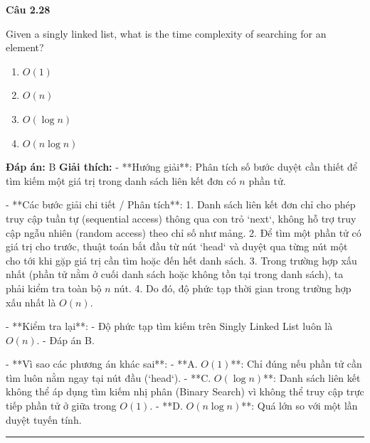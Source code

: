 \documentclass[11pt,a4paper]{article}
\newenvironment{question}[1]{%
  \par\vspace{1em}\noindent\textbf{\large Câu #1}\par\vspace{0.4em}
}{%
  \par\vspace{1em}\hrule\vspace{0.6em}
}
\newenvironment{choices}{%
  \begin{enumerate}[label=\textbf{\Alph*.},leftmargin=2.2em,itemsep=2pt,topsep=3pt]
}{%
  \end{enumerate}
}
\newcommand{\choice}{\item}
\begin{document}
\begin{question}{2.28}
Given a singly linked list, what is the time complexity of searching for an element?
\begin{choices}
\choice \(O(1)\)
\choice \(O(n)\)
\choice \(O(\log n)\)
\choice \(O(n \log n)\)
\end{choices}
\textbf{Đáp án:} B
\textbf{Giải thích:} - **Hướng giải**:
  Phân tích số bước duyệt cần thiết để tìm kiếm một giá trị trong danh sách liên kết đơn có \(n\) phần tử.

- **Các bước giải chi tiết / Phân tích**:
  1. Danh sách liên kết đơn chỉ cho phép truy cập tuần tự (sequential access) thông qua con trỏ `next`, không hỗ trợ truy cập ngẫu nhiên (random access) theo chỉ số như mảng.
  2. Để tìm một phần tử có giá trị cho trước, thuật toán bắt đầu từ nút `head` và duyệt qua từng nút một cho tới khi gặp giá trị cần tìm hoặc đến hết danh sách.
  3. Trong trường hợp xấu nhất (phần tử nằm ở cuối danh sách hoặc không tồn tại trong danh sách), ta phải kiểm tra toàn bộ \(n\) nút.
  4. Do đó, độ phức tạp thời gian trong trường hợp xấu nhất là \(O(n)\).

- **Kiểm tra lại**:
  - Độ phức tạp tìm kiếm trên Singly Linked List luôn là \(O(n)\).
  - Đáp án B.

- **Vì sao các phương án khác sai**:
  - **A. \(O(1)\)**: Chỉ đúng nếu phần tử cần tìm luôn nằm ngay tại nút đầu (`head`).
  - **C. \(O(\log n)\)**: Danh sách liên kết không thể áp dụng tìm kiếm nhị phân (Binary Search) vì không thể truy cập trực tiếp phần tử ở giữa trong \(O(1)\).
  - **D. \(O(n \log n)\)**: Quá lớn so với một lần duyệt tuyến tính.
\end{question}
\end{document}
